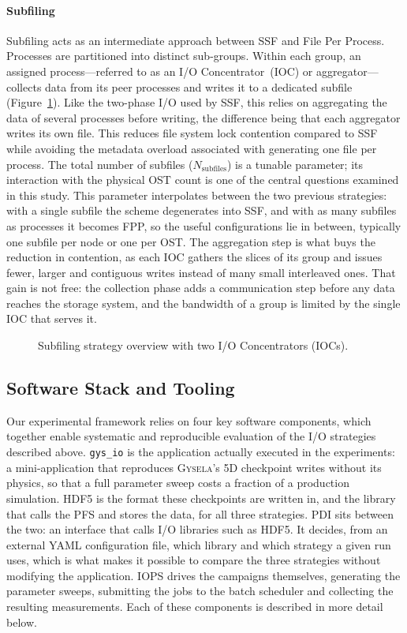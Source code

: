 \paragraph{Subfiling}
\label{sec:subfiling}
Subfiling acts as an intermediate approach between SSF and File Per Process.
Processes are partitioned into distinct sub-groups. Within each group, an
assigned process---referred to as an I/O Concentrator~(IOC) or aggregator---collects
data from its peer processes and writes it to a dedicated subfile
(Figure~\ref{fig:subfiling_schema}). Like the two-phase I/O used by SSF, this relies
on aggregating the data of several processes before writing, the difference being that
each aggregator writes its own file. This reduces file system lock contention
compared to SSF while avoiding the metadata overload associated with generating one
file per process. The total number of subfiles ($N_{\text{subfiles}}$) is a tunable
parameter; its interaction with the physical OST count is one of the central
questions examined in this study.
This parameter interpolates between the two previous strategies: with a single
subfile the scheme degenerates into SSF, and with as many subfiles as processes it becomes
FPP, so the useful configurations lie in between, typically one subfile per node or one
per OST. The aggregation step is what buys the reduction in contention, as each IOC
gathers the slices of its group and issues fewer, larger and contiguous writes instead
of many small interleaved ones. That gain is not free: the collection phase adds a
communication step before any data reaches the storage system, and the bandwidth of a
group is limited by the single IOC that serves it.

\begin{figure}[htbp]
  \centering
  
  \caption{Subfiling strategy overview with two I/O Concentrators (IOCs).}
  \label{fig:subfiling_schema}
\end{figure}

\subsection{Software Stack and Tooling}
\label{sec:tools}

Our experimental framework relies on four key software components, which together
enable systematic and reproducible evaluation of the I/O strategies described above.
\texttt{gys\_io} is the application actually executed in the experiments: a
mini-application that reproduces \textsc{Gysela}'s 5D checkpoint writes without its
physics, so that a full parameter sweep costs a fraction of a production simulation.
HDF5 is the format these checkpoints are written in, and the library that calls the
PFS and stores the data, for all three strategies. PDI sits between the two: an
interface that calls I/O libraries such as HDF5. It decides, from an external
YAML configuration file, which library and which strategy a given run uses, which is what
makes it possible to compare the three strategies without modifying the application.
IOPS drives the campaigns themselves, generating the parameter sweeps, submitting the
jobs to the batch scheduler and collecting the resulting measurements. Each of these
components is described in more detail below.


